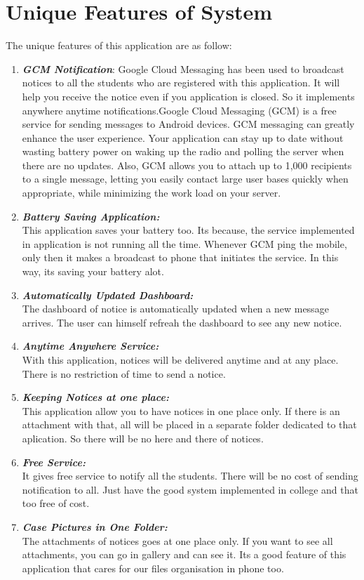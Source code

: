 \section{Unique Features of System}
The unique features of this application are as follow:
\begin{enumerate}
\item \textbf{\emph{GCM Notification}}:
Google Cloud Messaging has been used to broadcast notices to all the students who are registered with this application. It will help you 
receive the notice even if you application is closed. So it implements anywhere anytime notifications.Google Cloud Messaging (GCM) is a free service for sending messages to Android devices. GCM messaging can greatly enhance the user experience. Your application can stay up to date without wasting battery power on waking up the radio and polling the server when there are no updates. Also, GCM allows you to attach up to 1,000 recipients to a single message, letting you easily contact large user bases quickly when appropriate, while minimizing the work load on your server.

\item \textbf{\emph{Battery Saving Application:}}\\
This application saves your battery too. Its because, the service implemented in application is not running all the time. Whenever GCM ping 
the mobile, only then it makes a broadcast to phone that initiates the service. In this way, its saving your battery alot.

\item \textbf{\emph{Automatically Updated Dashboard:}}\\
The dashboard of notice is automatically updated when a new message arrives. The user can himself refreah the dashboard 
to see any new notice.

\item \textbf{\emph{Anytime Anywhere Service:}}\\
With this application, notices will be delivered anytime and at any place. There is no restriction of time to 
send a notice.

\item \textbf{\emph{Keeping Notices at one place:}}\\
This application allow you to have notices in one place only. If there is an attachment with that, all will be placed in a separate
folder dedicated to that aplication. So there will be no here and there of notices.

\item \textbf{\emph{Free Service:}}\\
It gives free service to notify all the students. There will be no cost of sending notification to all.
Just have the good system implemented in college and that too free of cost.

\item \textbf{\emph{Case Pictures in One Folder:}}\\
The attachments of notices goes at one place only. If you want to see all attachments, you can go in gallery and can see it. 
Its a good feature of this application that cares for our files organisation in phone too.
\end{enumerate}

